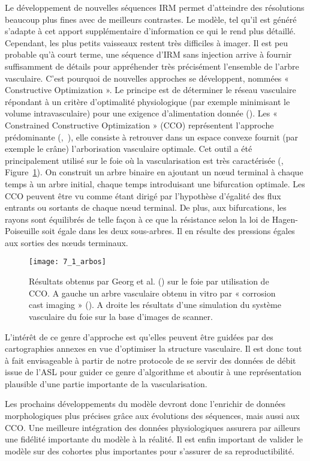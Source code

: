 Le développement de nouvelles séquences IRM permet d’atteindre des résolutions beaucoup
plus fines avec de meilleurs contrastes. Le modèle, tel qu’il est généré s’adapte à cet apport
supplémentaire d’information ce qui le rend plus détaillé. Cependant, les plus petits vaisseaux restent
très difficiles à imager. Il est peu probable qu’à court terme, une séquence d’IRM sans injection arrive
à fournir suffisamment de détails pour appréhender très précisément l’ensemble de l’arbre vasculaire.
C’est pourquoi de nouvelles approches se développent, nommées « Constructive Optimization ». Le
principe est de déterminer le réseau vasculaire répondant à un critère d’optimalité physiologique (par
exemple minimisant le volume intravasculaire) pour une exigence d’alimentation donnée (\cite{Schwen2012}). Les
« Constrained Constructive Optimization » (CCO) représentent l’approche prédominante (\cite{Schreiner1993},~\cite{Karch1998}),
elle consiste à retrouver dans un espace convexe fournit (par exemple le crâne) l’arborisation
vasculaire optimale. Cet outil a été principalement utilisé sur le foie où la vascularisation est très
caractérisée  (\cite{Georg2010}, Figure~\ref{fig:7_1_arbos}). On construit un arbre binaire en ajoutant un nœud terminal à chaque
temps à un arbre initial, chaque temps introduisant une bifurcation optimale. Les CCO peuvent être vu
comme étant dirigé par l’hypothèse d’égalité des flux entrants ou sortants de chaque nœud terminal.
De plus, aux bifurcations, les rayons sont équilibrés de telle façon à ce que la résistance selon la loi de
Hagen-Poiseuille soit égale dans les deux sous-arbres. Il en résulte des pressions égales aux sorties des
nœuds terminaux.

\begin{figure}[!t]
\centering
\texttt{[image: 7\_1\_arbos]}
\caption{Résultats obtenus par Georg et al. (\cite{Georg2010}) sur le foie par utilisation de CCO. A gauche un arbre vasculaire obtenu in
vitro par « corrosion cast imaging » (\cite{Hahn2003}). A droite les résultats d’une simulation du système vasculaire du foie sur la base
d’images de scanner.}
\label{fig:7_1_arbos}	
\end{figure}
L’intérêt de ce genre d’approche est qu’elles peuvent être guidées par des cartographies annexes en
vue d’optimiser la structure vasculaire. Il est donc tout à fait envisageable à partir de notre protocole
de se servir des données de débit issue de l’ASL pour guider ce genre d’algorithme et aboutir à une
représentation plausible d’une partie importante de la vascularisation.

Les prochains développements du modèle devront donc l’enrichir de données morphologiques
plus précises grâce aux évolutions des séquences, mais aussi aux CCO. Une meilleure intégration des
données physiologiques assurera par ailleurs une fidélité importante du modèle à la réalité. Il est enfin
important de valider le modèle sur des cohortes plus importantes pour s’assurer de sa reproductibilité.







{}
